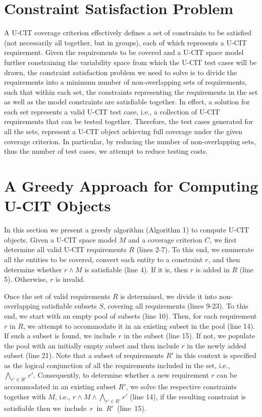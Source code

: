 \documentclass[EPiCempty]{easychair}
\begin{document}
\section{Constraint Satisfaction Problem}
\label{problem}

A U-CIT coverage criterion effectively defines a set of constraints to be satisfied (not necessarily all together, but in groups), each of which represents a U-CIT requirement. Given the requirements to be covered and a U-CIT space model further constraining the variability space from which the U-CIT test cases will be drawn, the constraint satisfaction problem we need to solve is to divide the requirements into a minimum number of non-overlapping sets of requirements, such that within each set, the constraints representing the requirements in the set as well as the model constraints are satisfiable together. In effect, a solution for each set represents a valid U-CIT test case, i.e., a collection of U-CIT requirements that can be tested together. Therefore, the test cases generated for all the sets, represent a U-CIT object achieving full coverage under the given coverage criterion. In particular, by reducing the number of non-overlapping sets, thus the number of test cases, we attempt to reduce testing costs.

\section{A Greedy Approach for Computing U-CIT Objects} 
\label{Approach}

In this section we present a greedy algorithm (Algorithm 1) to compute U-CIT objects. Given a U-CIT space model $M$ and a coverage criterion $C$, we first determine all valid U-CIT requirements $R$ (lines 2-7). To this end, we enumerate all the entities to be covered, convert each entity to a constraint $r$, and then determine whether $r \wedge M$ is satisfiable (line 4). If it is, then $r$ is added in $R$ (line 5). Otherwise, $r$ is invalid. 

Once the set of valid requirements $R$ is determined, we divide it into non-overlapping satisfiable subsets $S$, covering all requirements (lines 9-23). To this end, we start with an empty pool of subsets (line 10). Then, for each requirement $r$ in $R$, we attempt to accommodate it in an existing subset in the pool (line 14). If such a subset is found, we include $r$ in the subset (line 15). If not, we populate the pool with an initially empty subset and then include $r$ in the newly added subset (line 21). Note that a subset of requirements $R'$ in this context is specified as the logical conjunction of all the requirements included in the set, i.e., $\bigwedge_{r' \in R'}r'$. Consequently, to determine whether a new requirement $r$ can be accommodated in an existing subset $R'$, we solve the respective constraints together with $M$, i.e.,  $r \wedge M \wedge \bigwedge_{r' \in R'}r'$ (line 14), if the resulting constraint is satisfiable then we~include~$r$~in~$R'$~(line~15). 
\end{document}
